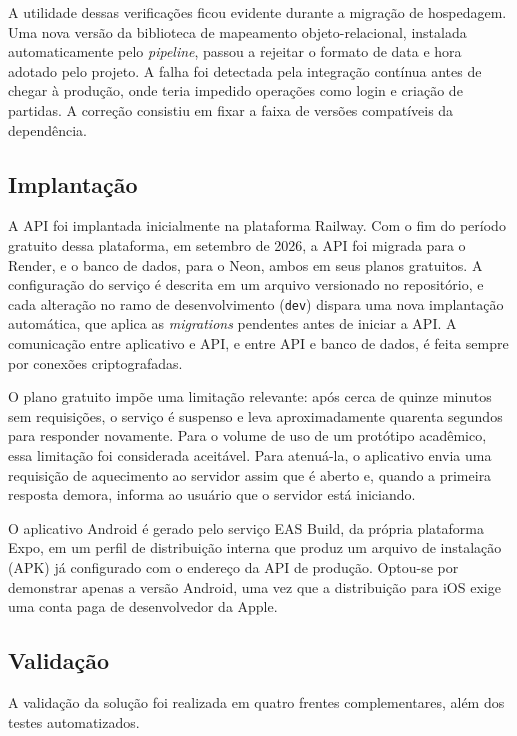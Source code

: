 \documentclass[a4paper, 12pt]{article}
\begin{document}
\begin{justify}
A utilidade dessas verificações ficou evidente durante a migração de hospedagem. Uma nova versão da biblioteca de mapeamento objeto-relacional, instalada automaticamente pelo \textit{pipeline}, passou a rejeitar o formato de data e hora adotado pelo projeto. A falha foi detectada pela integração contínua antes de chegar à produção, onde teria impedido operações como login e criação de partidas. A correção consistiu em fixar a faixa de versões compatíveis da dependência.

\subsection{Implantação}
\label{sec:implantacao}

A API foi implantada inicialmente na plataforma Railway. Com o fim do período gratuito dessa plataforma, em setembro de 2026, a API foi migrada para o Render, e o banco de dados, para o Neon, ambos em seus planos gratuitos. A configuração do serviço é descrita em um arquivo versionado no repositório, e cada alteração no ramo de desenvolvimento (\texttt{dev}) dispara uma nova implantação automática, que aplica as \textit{migrations} pendentes antes de iniciar a API. A comunicação entre aplicativo e API, e entre API e banco de dados, é feita sempre por conexões criptografadas.

O plano gratuito impõe uma limitação relevante: após cerca de quinze minutos sem requisições, o serviço é suspenso e leva aproximadamente quarenta segundos para responder novamente. Para o volume de uso de um protótipo acadêmico, essa limitação foi considerada aceitável. Para atenuá-la, o aplicativo envia uma requisição de aquecimento ao servidor assim que é aberto e, quando a primeira resposta demora, informa ao usuário que o servidor está iniciando.

O aplicativo Android é gerado pelo serviço EAS Build, da própria plataforma Expo, em um perfil de distribuição interna que produz um arquivo de instalação (APK) já configurado com o endereço da API de produção. Optou-se por demonstrar apenas a versão Android, uma vez que a distribuição para iOS exige uma conta paga de desenvolvedor da Apple.

\subsection{Validação}
\label{sec:validacao}

A validação da solução foi realizada em quatro frentes complementares, além dos testes automatizados.


\end{justify}
\end{document}
